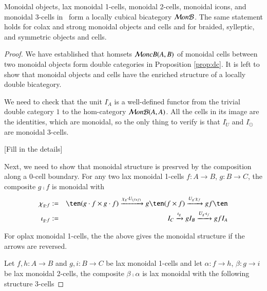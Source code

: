 \begin{thm}\label{thm:lcbc}
  Monoidal objects, lax monoidal 1-cells, monoidal 2-cells, monoidal icons, and monoidal 3-cells in \fB\ form a locally cubical bicategory $\mathcal{M} on\mathcal{B}$. The same statement holds for colax and strong monoidal objects and cells and for braided, sylleptic, and symmetric objects and cells.
\end{thm}

\begin{proof}
We have established that homsets $\mathcal{M} oncB(A,B)$ of monoidal cells between two monoidal objects form double categories in Proposition \ref{prop:dc}. It is left to show that monoidal objects and cells have the enriched structure of a locally double bicategory.

We need to check that the unit $I^{\comp}_A$ is a well-defined functor from the trivial double category $1$ to the hom-category $\mathcal{M} on\mathcal{B}(A,A)$. 
All the cells in its image are the identities, which are monoidal, so the only thing to verify is that $I^{\comp}_{U}$ and $I^{\comp}_{\odot}$ are monoidal 3-cells. 

[Fill in the details]

Next, we need to show that monoidal structure is presrved by the composition along a 0-cell boundary.
For any two lax monoidal 1-cells $f:A \rightarrow B$, $g:B \rightarrow C$, the composite $g \comp f$ is monoidal with 
\begin{align}
\chi_{g \comp f} &:= &\ten (g\comp f \times g\comp f) \xrightarrow{\chi_g \comp U_{(f \times f)}} g \ten (f \times f) \xrightarrow{U_g \comp \chi_f} gf\ten\\
\iota_{g \comp f} & := &I_C \xrightarrow{\iota_g} g I_B \xrightarrow{U_g \comp \iota_f} gfI_A
\end{align}

For oplax monoidal 1-cells, the the above gives the monoidal structure if the arrows are reversed.

Let $f,h: A \rightarrow B $ and $g,i: B \rightarrow C$ be lax monoidal 1-cells and let $\alpha: f \rightarrow h$, $\beta: g \rightarrow i$ be lax monoidal 2-cells, the composite $\beta \comp \alpha$ is lax monoidal with the following structure 3-cells


\end{proof}
